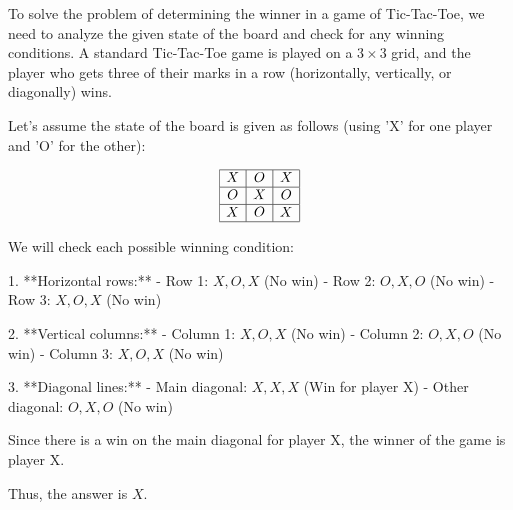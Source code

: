 To solve the problem of determining the winner in a game of Tic-Tac-Toe, we need to analyze the given state of the board and check for any winning conditions. A standard Tic-Tac-Toe game is played on a \(3 \times 3\) grid, and the player who gets three of their marks in a row (horizontally, vertically, or diagonally) wins.

Let's assume the state of the board is given as follows (using 'X' for one player and 'O' for the other):

\[
\begin{array}{|c|c|c|}
\hline
X & O & X \\
\hline
O & X & O \\
\hline
X & O & X \\
\hline
\end{array}
\]

We will check each possible winning condition:

1. **Horizontal rows:**
   - Row 1: \(X, O, X\) (No win)
   - Row 2: \(O, X, O\) (No win)
   - Row 3: \(X, O, X\) (No win)

2. **Vertical columns:**
   - Column 1: \(X, O, X\) (No win)
   - Column 2: \(O, X, O\) (No win)
   - Column 3: \(X, O, X\) (No win)

3. **Diagonal lines:**
   - Main diagonal: \(X, X, X\) (Win for player X)
   - Other diagonal: \(O, X, O\) (No win)

Since there is a win on the main diagonal for player X, the winner of the game is player X.

Thus, the answer is \(\boxed{X}\).